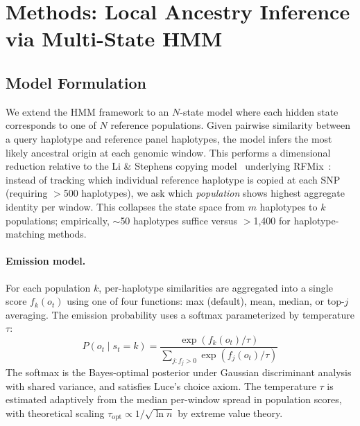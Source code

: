 \section{Methods: Local Ancestry Inference via Multi-State HMM}
\label{sec:methods_ancestry}

\subsection{Model Formulation}

We extend the HMM framework to an $N$-state model where each hidden state corresponds to one of $N$ reference populations. Given pairwise similarity between a query haplotype and reference panel haplotypes, the model infers the most likely ancestral origin at each genomic window. This performs a dimensional reduction relative to the Li \& Stephens copying model~\cite{li2003stephens} underlying RFMix~\cite{maples2013rfmix}: instead of tracking which individual reference haplotype is copied at each SNP (requiring $>$500 haplotypes), we ask which \emph{population} shows highest aggregate identity per window. This collapses the state space from $m$ haplotypes to $k$ populations; empirically, $\sim$50 haplotypes suffice versus $>$1{,}400 for haplotype-matching methods.

\paragraph{Emission model.}
For each population $k$, per-haplotype similarities are aggregated into a single score $f_k(o_t)$ using one of four functions: max (default), mean, median, or top-$j$ averaging. The emission probability uses a softmax parameterized by temperature $\tau$:
\begin{equation}
P(o_t \mid s_t = k) = \frac{\exp(f_k(o_t) / \tau)}{\sum_{j : f_j > 0} \exp(f_j(o_t) / \tau)}
\end{equation}
The softmax is the Bayes-optimal posterior under Gaussian discriminant analysis with shared variance, and satisfies Luce's choice axiom. The temperature $\tau$ is estimated adaptively from the median per-window spread in population scores, with theoretical scaling $\tau_{\text{opt}} \propto 1/\sqrt{\ln n}$ by extreme value theory.


